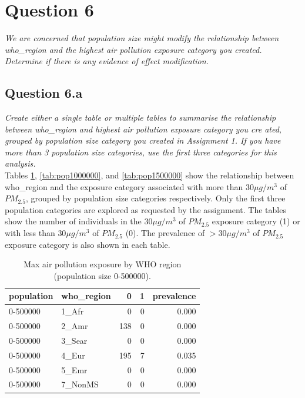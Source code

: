 \section[Question 6]{Question 6} \label{sec:q6}
\textit{We are concerned that population size might modify the relationship between who\_region
and the highest air pollution exposure category you created. Determine if there is
any evidence of effect modification.}

\subsection{Question 6.a}
\textit{Create either a single table or multiple tables to summarise the relationship
between who\_region and highest air pollution exposure category you cre
ated, grouped by population size category you created in Assignment 1.
If you have more than 3 population size categories, use the first three categories
for this analysis.}\\

\noindent Tables \ref{tab:pop500000}, \ref{tab:pop1000000}, and \ref{tab:pop1500000} show the relationship between who\_region and the exposure category associated with more than $30 \mu g/m^3 $ of $PM_{2.5}$, grouped by population size categories respectively. Only the first three population categories are explored as requested by the assignment. The tables show the number of individuals in the $30 \mu g/m^3 $ of $PM_{2.5}$ exposure category (1) or with less than $30 \mu g/m^3 $ of $PM_{2.5}$ (0). The prevalence of $ > 30 \mu g/m^3 $ of $PM_{2.5}$ exposure category is also shown in each table.

\begin{table}[H]
    \centering
    \begin{tabular}{llrrr}
        \toprule
        population & who\_region & 0 & 1 & prevalence \\
        \midrule
        0-500000 & 1\_Afr & 0 & 0 & 0.000 \\
        0-500000 & 2\_Amr & 138 & 0 & 0.000 \\
        0-500000 & 3\_Sear & 0 & 0 & 0.000 \\
        0-500000 & 4\_Eur & 195 & 7 & 0.035 \\
        0-500000 & 5\_Emr & 0 & 0 & 0.000 \\
        0-500000 & 7\_NonMS & 0 & 0 & 0.000 \\
        \bottomrule
    \end{tabular}
\caption{Max air pollution exposure by WHO region (population size 0-500000).}
\label{tab:pop500000}
\end{table}

